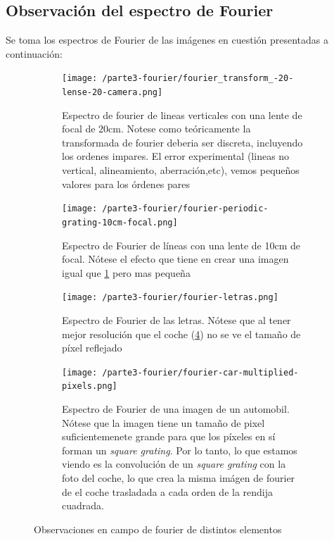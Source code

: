 \documentclass{./packages/optica-article}
\begin{document}
\subsection{Observación del espectro de Fourier}
Se toma los espectros de Fourier de las imágenes en cuestión presentadas a continuación:

\begin{figure}[hptb]
\begin{center}
    \begin{subfigure}[t]{0.45\textwidth}\centering
        \texttt{[image: /parte3-fourier/fourier\_transform\_-20-lense-20-camera.png]}
    \caption{Espectro de fourier de lineas verticales  con una lente de focal de 20cm. Notese como teóricamente la transformada de fourier deberia ser discreta, incluyendo los ordenes impares. El error experimental (lineas no vertical, alineamiento, aberración,etc), vemos pequeños valores para los órdenes pares}
    \label{fig:fourier1}
    \end{subfigure}
	\quad
		\begin{subfigure}[t]{0.45\textwidth}\centering
		\texttt{[image: /parte3-fourier/fourier-periodic-grating-10cm-focal.png]}
    \caption{Espectro de Fourier de líneas con una lente de 10cm de focal. Nótese el efecto que tiene en crear una imagen igual que \ref{fig:fourier1} pero mas pequeña}
    \label{fourier4}
	\end{subfigure}

	\begin{subfigure}[t]{0.45\textwidth}\centering
		\texttt{[image: /parte3-fourier/fourier-letras.png]}
    \caption{Espectro de Fourier de las letras. Nótese que al tener mejor resolución que el coche (\ref{fig:fourier2}) no se ve el tamaño de píxel reflejado}
    \label{fourier3}
	\end{subfigure}
	\quad
	\begin{subfigure}[t]{0.45\textwidth}\centering
		\texttt{[image: /parte3-fourier/fourier-car-multiplied-pixels.png]}
    \caption{Espectro de Fourier de una imagen de un automobil. Nótese que la imagen tiene un tamaño de pixel suficientemenete grande para que los píxeles en sí forman un \emph{square grating}. Por lo tanto, lo que estamos viendo es la convolución de un \emph{square grating} con la foto del coche, lo que crea la misma imágen de fourier de el coche trasladada a cada orden de la rendija cuadrada.}
    \label{fig:fourier2}
	\end{subfigure}	
	\caption{Observaciones en campo de fourier de distintos elementos}\label{fig:alltalbot}
\end{center}
\end{figure}
\end{document}
